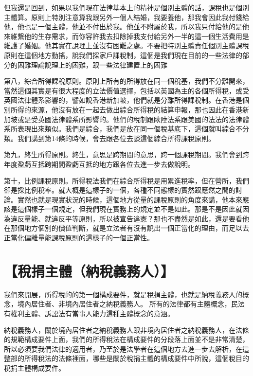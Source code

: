 \documentclass[oneside,sub3section]{ctexbook}
\begin{document}
但我還是回到，如果以我們現在法律基本上的精神是個別主體的話，課稅也是個別主體算。原則上特別注意算我跟另外一個人結婚，我要養他，那我會因此我付錢給他，他也是一個主體，他並不付出於我。他並不附屬於我，所以我只付給他的是他來維繫他的生存需求，而你容許我去扣除掉我支付給另外一半的這一個生活費用是維護了婚姻。他其實在說理上並沒有困難之處。不要把特別主體責任個別主體課稅原則在這個地方動搖，說我們採家戶課稅制，這個是我們現在目前的一些法律的部分的困難理論說理上的困難，跟一些法律建置上的困難

第八，綜合所得課稅原則。原則上所有的所得放在同一個稅基，我們不分離開來，當然這個其實是有很大程度的立法價值選擇，包括以英國為主的各個所得稅，或受英國法律體系影響的，譬如說香港新加坡，他們就是分離所得課稅制。在香港是個別所得的來源，他沒有放在一起去做出綜合所得稅的結算申報，那也因此在香港新加坡或是受英國法律體系所影響的。他們的稅制跟歐陸法系跟美國的法法的法律體系所表現出來類似。我們是綜合，我們是放在同一個稅基底下，這個就叫綜合不分類。我們講到第14條的時候，會去跟各位去談這個綜合所得課稅原則。

第九，終生所得原則。終生，意思是跨期間的意思，跨一個課稅期間。我們會到跨年度盈虧互抵跨期間盈虧互抵的地方跟各位去進一步去做說明。

第十，比例課稅原則。所得稅法我們在綜合所得稅是用累進稅率，但在營所，我們卻是採比例稅率。就大概是這樣子的一個，各種不同態樣的實然跟應然之間的討論。實然也就是現實狀況的時候，這個地方從量的課稅原則的角度來講，他本來應該是這個樣子一個規定，但我們現在實務上的規定並不是如此。那是不是因此就因為違反量能、就違反平等原則，所以被宣告違憲？那也不盡然是如此，還是要看他在那個地方個別的價值判斷，就是立法者有沒有說出一個正當化的理由，而足以去正當化偏離量能課稅原則的這樣子的一個正當性。

\hypertarget{ux7a05ux6350ux4e3bux9ad4ux7d0dux7a05ux7fa9ux52d9ux4eba}{%
\section{【稅捐主體（納稅義務人）】}\label{ux7a05ux6350ux4e3bux9ad4ux7d0dux7a05ux7fa9ux52d9ux4eba}}

我們來開展，所得稅的的第一個構成要件，就是稅捐主體，也就是納稅義務人的概念，境內居住者、非境內居住者之納稅義務人。
所有的法律都有主體概念，民法有權利主體、訴訟法有當事人能力這種主體概念的意涵。

納稅義務人，關於境內居住者之納稅義務人跟非境內居住者之納稅義務人，在法條的規範構成要件上面，我們的所得稅法在構成要件的分段落上面並不是非常清楚，所以必須要我們法律的適用者，乃至於是法學者在這個地方去進一步去解析，在這整部的所得稅法的法條裡面，哪些是關於稅捐主體的構成要件中所說，這個稅目的稅捐主體構成要件。
\end{document}
